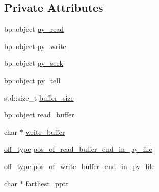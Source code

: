 \subsection*{\-Private \-Attributes}
\begin{DoxyCompactItemize}
\item 
bp\-::object \hyperlink{classecto_1_1py_1_1streambuf_a77a192df96e66a2e19cdfce078017df8}{py\-\_\-read}
\item 
bp\-::object \hyperlink{classecto_1_1py_1_1streambuf_aad739c2392d3c8f0de7d44719c7cc37a}{py\-\_\-write}
\item 
bp\-::object \hyperlink{classecto_1_1py_1_1streambuf_ad4e0dc91a74411d2181897d026ff945b}{py\-\_\-seek}
\item 
bp\-::object \hyperlink{classecto_1_1py_1_1streambuf_a3735b9e199be3e58c277354127a86146}{py\-\_\-tell}
\item 
std\-::size\-\_\-t \hyperlink{classecto_1_1py_1_1streambuf_a8d60fa297a9140474d136a48342ac850}{buffer\-\_\-size}
\item 
bp\-::object \hyperlink{classecto_1_1py_1_1streambuf_ac239012691e5d3485572159a53600005}{read\-\_\-buffer}
\item 
char $\ast$ \hyperlink{classecto_1_1py_1_1streambuf_a331e541fac616ac9ac3a81fb117057c6}{write\-\_\-buffer}
\item 
\hyperlink{classecto_1_1py_1_1streambuf_aa01772d1599fc51089a209a69fcab7c7}{off\-\_\-type} \hyperlink{classecto_1_1py_1_1streambuf_a7b219ca66aa176fdfbc9d6fb63d15cef}{pos\-\_\-of\-\_\-read\-\_\-buffer\-\_\-end\-\_\-in\-\_\-py\-\_\-file}
\item 
\hyperlink{classecto_1_1py_1_1streambuf_aa01772d1599fc51089a209a69fcab7c7}{off\-\_\-type} \hyperlink{classecto_1_1py_1_1streambuf_a1775b9bced7a5ff74fe30c788e20ad9e}{pos\-\_\-of\-\_\-write\-\_\-buffer\-\_\-end\-\_\-in\-\_\-py\-\_\-file}
\item 
char $\ast$ \hyperlink{classecto_1_1py_1_1streambuf_a8267e360cfb0201b1518a0dfd3d7c353}{farthest\-\_\-pptr}
\end{DoxyCompactItemize}


